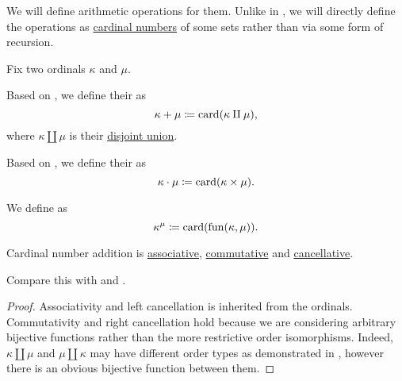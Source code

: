\begin{definition}\label{def:cardinal_arithmetic}
  We will define arithmetic operations for them. Unlike in , we will directly define the operations as \hyperref[thm:cardinality_existence]{cardinal numbers} of some sets rather than via some form of recursion.

  Fix two ordinals \( \kappa \) and \( \mu \).
  \begin{thmenum}
     Based on , we define their  as
    \begin{equation*}
      \kappa + \mu \coloneqq \operatorname{card}(\kappa \amalg \mu),
    \end{equation*}
    where \( \kappa \amalg \mu \) is their \hyperref[def:disjoint_union]{disjoint union}.

     Based on , we define their  as
    \begin{equation*}
      \kappa \cdot \mu \coloneqq \operatorname{card}(\kappa \times \mu).
    \end{equation*}

     We define  as
    \begin{equation*}
      \kappa^\mu \coloneqq \operatorname{card}(\operatorname{fun}(\kappa, \mu)).
    \end{equation*}
  \end{thmenum}
\end{definition}

\begin{proposition}\label{thm:cardinal_addition_algebraic_properties}
  Cardinal number addition is \hyperref[def:binary_operation/associative]{associative}, \hyperref[def:binary_operation/associative]{commutative} and \hyperref[def:binary_operation/cancellative]{cancellative}.

  Compare this with  and .
\end{proposition}
\begin{proof}
  Associativity and left cancellation is inherited from the ordinals. Commutativity and right cancellation hold because we are considering arbitrary bijective functions rather than the more restrictive order isomorphisms. Indeed, \( \kappa \amalg \mu \) and \( \mu \amalg \kappa \) may have different order types as demonstrated in , however there is an obvious bijective function between them.
\end{proof}

